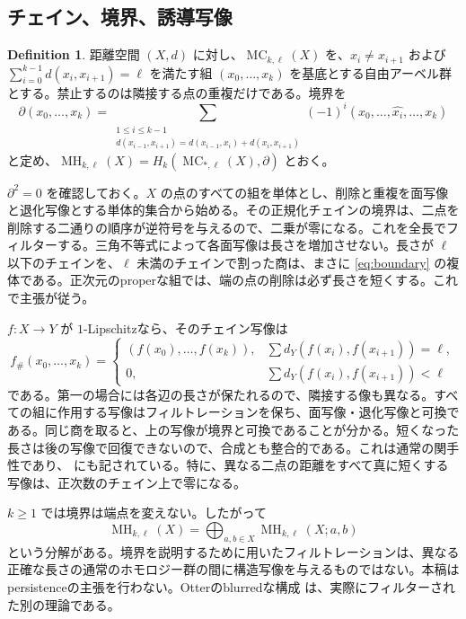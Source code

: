 \documentclass[12pt]{amsart}
\theoremstyle{definition}
\newtheorem{defn}[thm]{Definition}
\theoremstyle{remark}
\numberwithin{equation}{section}
\DeclareMathOperator{\MH}{MH}
\DeclareMathOperator{\MC}{MC}
\begin{document}
\subsection{チェイン、境界、誘導写像}
\begin{defn}\label{def:chains}
距離空間 $(X,d)$ に対し、$\MC_{k,\ell}(X)$ を、$x_i\ne x_{i+1}$ および $\sum_{i=0}^{k-1}d(x_i,x_{i+1})=\ell$ を満たす組 $(x_0,\ldots,x_k)$ を基底とする自由アーベル群とする。禁止するのは隣接する点の重複だけである。境界を
\begin{equation}\label{eq:boundary}
 \partial(x_0,\ldots,x_k)=
 \sum_{\substack{1\le i\le k-1\\d(x_{i-1},x_{i+1})=d(x_{i-1},x_i)+d(x_i,x_{i+1})}}
 (-1)^i(x_0,\ldots,\widehat{x_i},\ldots,x_k)
\end{equation}
と定め、$\MH_{k,\ell}(X)=H_k(\MC_{*,\ell}(X),\partial)$ とおく。
\end{defn}
$\partial^2=0$ を確認しておく。$X$ の点のすべての組を単体とし、削除と重複を面写像と退化写像とする単体的集合から始める。その正規化チェインの境界は、二点を削除する二通りの順序が逆符号を与えるので、二乗が零になる。これを全長でフィルターする。三角不等式によって各面写像は長さを増加させない。長さが $\ell$ 以下のチェインを、$\ell$ 未満のチェインで割った商は、まさに \eqref{eq:boundary} の複体である。正次元のproperな組では、端の点の削除は必ず長さを短くする。これで主張が従う。

$f:X\to Y$ が $1$-Lipschitzなら、そのチェイン写像は
\begin{equation}\label{eq:functor}
 f_\#(x_0,\ldots,x_k)=
 \begin{cases}(f(x_0),\ldots,f(x_k)),&\sum d_Y(f(x_i),f(x_{i+1}))=\ell,\\
 0,&\sum d_Y(f(x_i),f(x_{i+1}))<\ell
 \end{cases}
\end{equation}
である。第一の場合には各辺の長さが保たれるので、隣接する像も異なる。すべての組に作用する写像はフィルトレーションを保ち、面写像・退化写像と可換である。同じ商を取ると、上の写像が境界と可換であることが分かる。短くなった長さは後の写像で回復できないので、合成とも整合的である。これは通常の関手性であり、\cite[Definition 2.1]{Hepworth} にも記されている。特に、異なる二点の距離をすべて真に短くする写像は、正次数のチェイン上で零になる。

$k\ge1$ では境界は端点を変えない。したがって
\begin{equation}\label{eq:endpoint-sum}
 \MH_{k,\ell}(X)=\bigoplus_{a,b\in X}\MH_{k,\ell}(X;a,b)
\end{equation}
という分解がある。境界を説明するために用いたフィルトレーションは、異なる正確な長さの通常のホモロジー群の間に構造写像を与えるものではない。本稿はpersistenceの主張を行わない。Otterのblurredな構成 \cite[Definition 28, Theorem 29]{Otter} は、実際にフィルターされた別の理論である。
\end{document}
